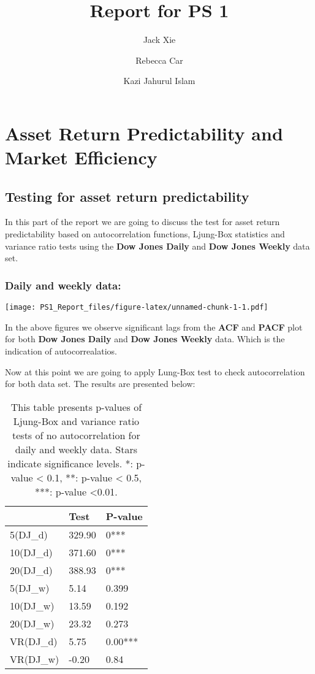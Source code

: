 \documentclass[
]{article}
\title{Report for PS 1}
\author{Jack Xie \and Rebecca Car \and Kazi Jahurul Islam}
\date{}
\begin{document}
\maketitle

\hypertarget{asset-return-predictability-and-market-efficiency}{%
\section{Asset Return Predictability and Market
Efficiency}\label{asset-return-predictability-and-market-efficiency}}

\hypertarget{testing-for-asset-return-predictability}{%
\subsection{Testing for asset return
predictability}\label{testing-for-asset-return-predictability}}

In this part of the report we are going to discuss the test for asset
return predictability based on autocorrelation functions, Ljung-Box
statistics and variance ratio tests using the \textbf{Dow Jones Daily}
and \textbf{Dow Jones Weekly} data set.

\hypertarget{daily-and-weekly-data}{%
\subsubsection{Daily and weekly data:}\label{daily-and-weekly-data}}

\texttt{[image: PS1\_Report\_files/figure-latex/unnamed-chunk-1-1.pdf]}

In the above figures we observe significant lags from the \textbf{ACF}
and \textbf{PACF} plot for both \textbf{Dow Jones Daily} and
\textbf{Dow Jones Weekly} data. Which is the indication of
autocorrealatios.

\newpage

Now at this point we are going to apply Lung-Box test to check
autocorrelation for both data set. The results are presented below:

\begin{table}

\caption{\label{tab:unnamed-chunk-3}This table presents p-values of Ljung-Box and variance ratio tests of no autocorrelation for daily and weekly data. Stars indicate significance levels. *: p-value < 0.1, **: p-value < 0.5, ***: p-value <0.01.}
\centering
\begin{tabular}[t]{l|l|l}
\hline
  & Test & P-value\\
\hline
5(DJ\_d) & 329.90 & 0***\\
\hline
10(DJ\_d) & 371.60 & 0***\\
\hline
20(DJ\_d) & 388.93 & 0***\\
\hline
5(DJ\_w) & 5.14 & 0.399\\
\hline
10(DJ\_w) & 13.59 & 0.192\\
\hline
20(DJ\_w) & 23.32 & 0.273\\
\hline
VR(DJ\_d) & 5.75 & 0.00***\\
\hline
VR(DJ\_w) & -0.20 & 0.84\\
\hline
\end{tabular}
\end{table}
\end{document}
